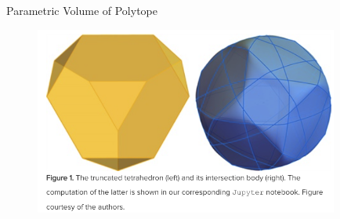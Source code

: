 \documentclass[aspectratio=169,xcolor=dvipsnames]{beamer}
\begin{document}

\begin{frame}{Parametric Volume of Polytope}
    \begin{figure}[h]
\includegraphics[width=10cm]{images/fig1.png}
\end{figure}
\end{frame}







\end{document}
